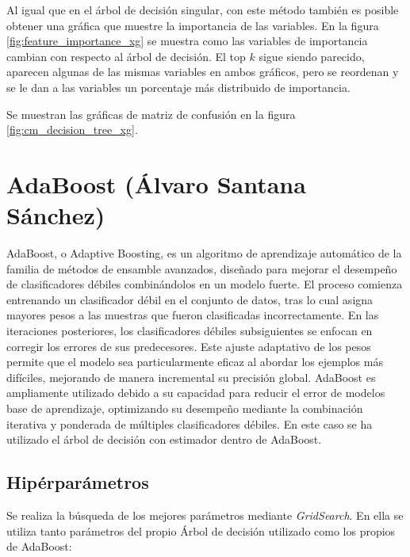\documentclass[12pt,letterpaper]{article}
\begin{document}
Al igual que en el árbol de decisión singular, con este método también es posible obtener una gráfica que muestre la importancia de las variables. En la figura \ref{fig:feature_importance_xg} se muestra como las variables de importancia cambian con respecto al árbol de decisión. El top $k$ sigue siendo parecido, aparecen algunas de las mismas variables en ambos gráficos, pero se reordenan y se le dan a las variables un porcentaje más distribuido de importancia.

Se muestran las gráficas de matriz de confusión en la figura \ref{fig:cm_decision_tree_xg}.

\section{AdaBoost (Álvaro Santana Sánchez) }

AdaBoost, o Adaptive Boosting, es un algoritmo de aprendizaje automático de la familia de métodos de ensamble avanzados, diseñado para mejorar el desempeño de clasificadores débiles combinándolos en un modelo fuerte. El proceso comienza entrenando un clasificador débil en el conjunto de datos, tras lo cual asigna mayores pesos a las muestras que fueron clasificadas incorrectamente. En las iteraciones posteriores, los clasificadores débiles subsiguientes se enfocan en corregir los errores de sus predecesores. Este ajuste adaptativo de los pesos permite que el modelo sea particularmente eficaz al abordar los ejemplos más difíciles, mejorando de manera incremental su precisión global. AdaBoost es ampliamente utilizado debido a su capacidad para reducir el error de modelos base de aprendizaje, optimizando su desempeño mediante la combinación iterativa y ponderada de múltiples clasificadores débiles. En este caso se ha utilizado el árbol de decisión con estimador dentro de AdaBoost.

\subsection{Hipérparámetros}
Se realiza la búsqueda de los mejores parámetros mediante \textit{GridSearch}. En ella se utiliza tanto parámetros del propio Árbol de decisión utilizado como los propios de AdaBoost:
\end{document}
